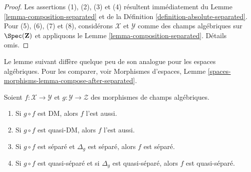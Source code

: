 \begin{proof}
Les assertions (1), (2), (3) et (4) résultent immédiatement du Lemme
\ref{lemma-composition-separated} et de la Définition
\ref{definition-absolute-separated}. Pour (5), (6), (7) et (8), considérons
$\mathcal{X}$ et $\mathcal{Y}$ comme des champs algébriques sur
$\Spec(\mathbf{Z})$ et appliquons le Lemme
\ref{lemma-composition-separated}. Détails omis.
\end{proof}

\noindent
Le lemme suivant diffère quelque peu de son analogue pour les espaces
algébriques. Pour les comparer, voir Morphismes d'espaces, Lemme
\ref{spaces-morphisms-lemma-compose-after-separated}.

\begin{lemma}
\label{lemma-compose-after-separated}
Soient $f : \mathcal{X} \to \mathcal{Y}$ et
$g : \mathcal{Y} \to \mathcal{Z}$ des morphismes de champs algébriques.
\begin{enumerate}
\item Si $g \circ f$ est DM, alors $f$ l'est aussi.
\item Si $g \circ f$ est quasi-DM, alors $f$ l'est aussi.
\item Si $g \circ f$ est séparé et $\Delta_g$ est séparé, alors $f$ est
séparé.
\item Si $g \circ f$ est quasi-séparé et si $\Delta_g$ est quasi-séparé,
alors $f$ est quasi-séparé.
\end{enumerate}
\end{lemma}

